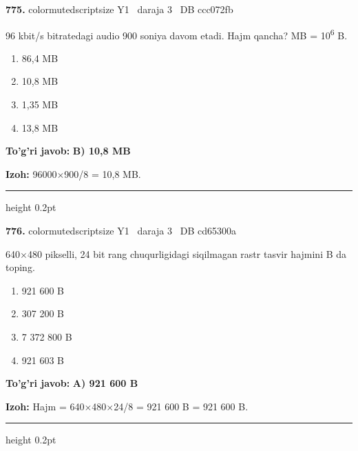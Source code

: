 \documentclass[10pt,a4paper,oneside]{article}
\begin{document}
\noindent\textbf{\color{ink}775.}  {color{muted}scriptsize Y1 \textbullet\ daraja 3 \textbullet\ DB ccc072fb}
\par
96 kbit/s bitratedagi audio 900 soniya davom etadi. Hajm qancha? MB = 10\textsuperscript{6} B.
\begin{enumerate}[label=\Alph*),leftmargin=9mm]
\item 86,4 MB
\item 10,8 MB
\item 1,35 MB
\item 13,8 MB
\end{enumerate}
\begin{tcolorbox}[enhanced,breakable,colback=teal!4,colframe=teal!50!black,boxrule=0.5pt,arc=1.1mm,left=3mm,right=3mm,top=1.7mm,bottom=1.7mm,before skip=2mm,after skip=2mm]
\textbf{\color{teal}To'g'ri javob:} \textbf{B) 10,8 MB}
\par\smallskip
\textbf{Izoh:} 96000\ensuremath{\times}900/8 = 10,8 MB.
\end{tcolorbox}
\vspace{2mm}\hrule height 0.2pt \vspace{3mm}

\noindent\textbf{\color{ink}776.}  {color{muted}scriptsize Y1 \textbullet\ daraja 3 \textbullet\ DB cd65300a}
\par
640\ensuremath{\times}480 pikselli, 24 bit rang chuqurligidagi siqilmagan rastr tasvir hajmini B da toping.
\begin{enumerate}[label=\Alph*),leftmargin=9mm]
\item 921 600 B
\item 307 200 B
\item 7 372 800 B
\item 921 603 B
\end{enumerate}
\begin{tcolorbox}[enhanced,breakable,colback=teal!4,colframe=teal!50!black,boxrule=0.5pt,arc=1.1mm,left=3mm,right=3mm,top=1.7mm,bottom=1.7mm,before skip=2mm,after skip=2mm]
\textbf{\color{teal}To'g'ri javob:} \textbf{A) 921 600 B}
\par\smallskip
\textbf{Izoh:} Hajm = 640\ensuremath{\times}480\ensuremath{\times}24/8 = 921 600 B = 921 600 B.
\end{tcolorbox}
\vspace{2mm}\hrule height 0.2pt \vspace{3mm}
\end{document}
